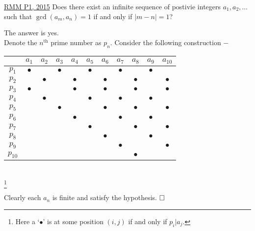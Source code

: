 \begin{problem}{3}{\href{https://artofproblemsolving.com/community/c6h627236p3763526}{RMM P1, 2015}}
	Does there exist an infinite sequence of postivie integers $a_1, a_2, \ldots$ such that $\gcd(a_m, a_n)=1$ if and only if $|m-n|=1$?
	\begin{solution} The answer is yes.\\
		Denote  the $n^{\text{th}}$ prime number as $p_n$. Consider the following construction $-$
		\begin{center}\begin{tabular}{c | c c c c c c c c c c}
			& $a_1$ & $a_2$ & $a_3$ & $a_4$ & $a_5$ & $a_6$ & $a_7$ & $a_8$ & $a_9$ & $a_{10}$ \\\hline
			$p_1$ & $\bullet$ & & $\bullet$ & & $\bullet$ & & $\bullet$ & & $\bullet$ & \\
			$p_2$ & & $\bullet$ & & $\bullet$ & & $\bullet$ & & $\bullet$ & & $\bullet$\\
			$p_3$ & $\bullet$ & & & $\bullet$ & & $\bullet$ & & $\bullet$ & & $\bullet$ \\
			$p_4$ & & $\bullet$ & & & $\bullet$ & & $\bullet$ & & $\bullet$ & \\
			$p_5$ & & & $\bullet$ & &  & $\bullet$ & & $\bullet$ & & $\bullet$ \\
			$p_6$ & & & & $\bullet$ & & & $\bullet$ & & $\bullet$ & \\
			$p_7$ & & & & & $\bullet$ & & & $\bullet$ & & $\bullet$ \\
			$p_8$ & & & & & & $\bullet$ & & & $\bullet$& \\
			$p_9$ & & & & & & & $\bullet$ & & & $\bullet$ \\
			$p_{10}$ & & & & & & & & $\bullet$ & &  \\


		\end{tabular}\\
	\footnote{Here a `$\bullet$' is at some position $(i, j)$ if and only if $p_i\lvert a_j$.}\end{center}

	\noindent Clearly each $a_n$ is finite and satisfy the hypothesis. $\qedwhite$
	\end{solution}
\end{problem}
	

